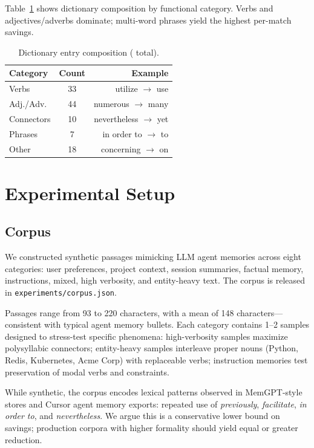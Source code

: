 \documentclass[10pt,twocolumn]{article}
\begin{document}
Table~\ref{tab:dict} shows dictionary composition by functional category. Verbs and adjectives/adverbs dominate; multi-word phrases yield the highest per-match savings.

\begin{table}[H]
    \centering
    \caption{Dictionary entry composition (\DictSize{} total).}
    \label{tab:dict}
    \small
    \begin{tabular}{lcr}
        \toprule
        Category & Count & Example \\
        \midrule
        Verbs & 33 & utilize $\rightarrow$ use \\
        Adj./Adv. & 44 & numerous $\rightarrow$ many \\
        Connectors & 10 & nevertheless $\rightarrow$ yet \\
        Phrases & 7 & in order to $\rightarrow$ to \\
        Other & 18 & concerning $\rightarrow$ on \\
        \bottomrule
    \end{tabular}
\end{table}

\section{Experimental Setup}

\subsection{Corpus}

We constructed \CorpusSize{} synthetic passages mimicking LLM agent memories across eight categories: user preferences, project context, session summaries, factual memory, instructions, mixed, high verbosity, and entity-heavy text. The corpus is released in \texttt{experiments/corpus.json}.

Passages range from 93 to 220 characters, with a mean of 148 characters---consistent with typical agent memory bullets. Each category contains 1--2 samples designed to stress-test specific phenomena: high-verbosity samples maximize polysyllabic connectors; entity-heavy samples interleave proper nouns (Python, Redis, Kubernetes, Acme Corp) with replaceable verbs; instruction memories test preservation of modal verbs and constraints.

While synthetic, the corpus encodes lexical patterns observed in MemGPT-style stores and Cursor agent memory exports: repeated use of \emph{previously}, \emph{facilitate}, \emph{in order to}, and \emph{nevertheless}. We argue this is a conservative lower bound on savings; production corpora with higher formality should yield equal or greater reduction.
\end{document}
